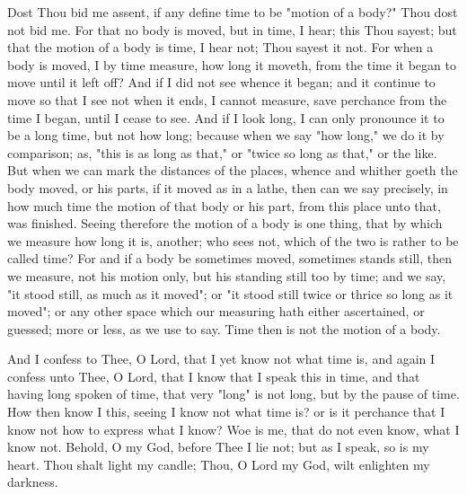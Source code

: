 \documentclass[b5paper,openright,12pt,twoside]{book}
\begin{document}
Dost Thou bid me assent, if any define time to be "motion of a body?"
Thou dost not bid me. For that no body is moved, but in time, I hear;
this Thou sayest; but that the motion of a body is time, I hear not;
Thou sayest it not. For when a body is moved, I by time measure, how
long it moveth, from the time it began to move until it left off? And if
I did not see whence it began; and it continue to move so that I see not
when it ends, I cannot measure, save perchance from the time I began,
until I cease to see. And if I look long, I can only pronounce it to be
a long time, but not how long; because when we say "how long," we do
it by comparison; as, "this is as long as that," or "twice so long as
that," or the like. But when we can mark the distances of the places,
whence and whither goeth the body moved, or his parts, if it moved as in
a lathe, then can we say precisely, in how much time the motion of
that body or his part, from this place unto that, was finished. Seeing
therefore the motion of a body is one thing, that by which we measure
how long it is, another; who sees not, which of the two is rather to
be called time? For and if a body be sometimes moved, sometimes stands
still, then we measure, not his motion only, but his standing still too
by time; and we say, "it stood still, as much as it moved"; or "it stood
still twice or thrice so long as it moved"; or any other space which our
measuring hath either ascertained, or guessed; more or less, as we use
to say. Time then is not the motion of a body.

And I confess to Thee, O Lord, that I yet know not what time is, and
again I confess unto Thee, O Lord, that I know that I speak this in
time, and that having long spoken of time, that very "long" is not long,
but by the pause of time. How then know I this, seeing I know not what
time is? or is it perchance that I know not how to express what I know?
Woe is me, that do not even know, what I know not. Behold, O my God,
before Thee I lie not; but as I speak, so is my heart. Thou shalt light
my candle; Thou, O Lord my God, wilt enlighten my darkness.
\end{document}
